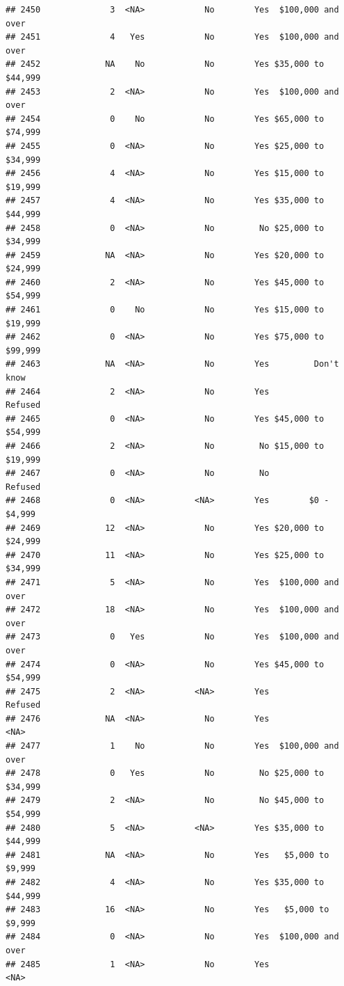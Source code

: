\documentclass[man]{apa6}
\begin{document}
\begin{verbatim}
## 2450              3  <NA>            No        Yes  $100,000 and over
## 2451              4   Yes            No        Yes  $100,000 and over
## 2452             NA    No            No        Yes $35,000 to $44,999
## 2453              2  <NA>            No        Yes  $100,000 and over
## 2454              0    No            No        Yes $65,000 to $74,999
## 2455              0  <NA>            No        Yes $25,000 to $34,999
## 2456              4  <NA>            No        Yes $15,000 to $19,999
## 2457              4  <NA>            No        Yes $35,000 to $44,999
## 2458              0  <NA>            No         No $25,000 to $34,999
## 2459             NA  <NA>            No        Yes $20,000 to $24,999
## 2460              2  <NA>            No        Yes $45,000 to $54,999
## 2461              0    No            No        Yes $15,000 to $19,999
## 2462              0  <NA>            No        Yes $75,000 to $99,999
## 2463             NA  <NA>            No        Yes         Don't know
## 2464              2  <NA>            No        Yes            Refused
## 2465              0  <NA>            No        Yes $45,000 to $54,999
## 2466              2  <NA>            No         No $15,000 to $19,999
## 2467              0  <NA>            No         No            Refused
## 2468              0  <NA>          <NA>        Yes        $0 - $4,999
## 2469             12  <NA>            No        Yes $20,000 to $24,999
## 2470             11  <NA>            No        Yes $25,000 to $34,999
## 2471              5  <NA>            No        Yes  $100,000 and over
## 2472             18  <NA>            No        Yes  $100,000 and over
## 2473              0   Yes            No        Yes  $100,000 and over
## 2474              0  <NA>            No        Yes $45,000 to $54,999
## 2475              2  <NA>          <NA>        Yes            Refused
## 2476             NA  <NA>            No        Yes               <NA>
## 2477              1    No            No        Yes  $100,000 and over
## 2478              0   Yes            No         No $25,000 to $34,999
## 2479              2  <NA>            No         No $45,000 to $54,999
## 2480              5  <NA>          <NA>        Yes $35,000 to $44,999
## 2481             NA  <NA>            No        Yes   $5,000 to $9,999
## 2482              4  <NA>            No        Yes $35,000 to $44,999
## 2483             16  <NA>            No        Yes   $5,000 to $9,999
## 2484              0  <NA>            No        Yes  $100,000 and over
## 2485              1  <NA>            No        Yes               <NA>

\end{verbatim}
\end{document}
